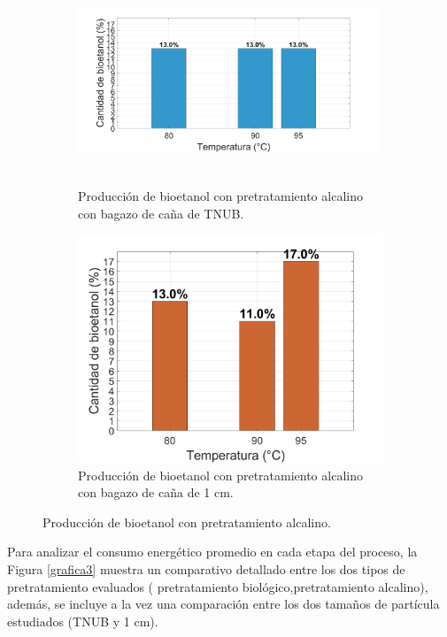 \documentclass[12pt]{article}
\begin{document}
		
				\begin{figure}[h]
				\centering
				\begin{subfigure}[b]{8 cm}
					\includegraphics[width=9cm, height=6.2cm]{imagenes/alcalino_TNUB}
					\caption{Producción de bioetanol con pretratamiento alcalino con bagazo de caña  de TNUB.}
					\label{bipoo}
				\end{subfigure}
				\hfill %
				\begin{subfigure}[b]{0.49\textwidth}
					\includegraphics[width=\linewidth]{imagenes/alcalino_1cm}
					\caption{Producción de bioetanol con pretratamiento alcalino con bagazo de caña de 1 cm.}
					\label{fig:imagen11}
				\end{subfigure}
				\caption{Producción de bioetanol con pretratamiento alcalino.}
				\label{producción}
			\end{figure}
			
Para analizar el consumo energético promedio en cada etapa del proceso, la Figura \ref{grafica3} muestra un comparativo detallado entre los dos tipos de pretratamiento evaluados ( pretratamiento biológico,pretratamiento alcalino), además, se incluye a la vez una comparación entre los dos tamaños de partícula estudiados (TNUB y 1 cm).
			
\end{document}
